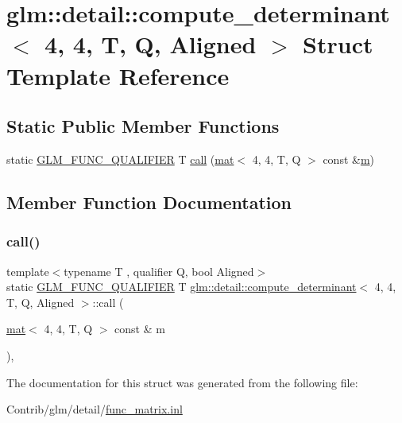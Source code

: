 \hypertarget{structglm_1_1detail_1_1compute__determinant_3_014_00_014_00_01_t_00_01_q_00_01_aligned_01_4}{}\section{glm\+:\+:detail\+:\+:compute\+\_\+determinant$<$ 4, 4, T, Q, Aligned $>$ Struct Template Reference}
\label{structglm_1_1detail_1_1compute__determinant_3_014_00_014_00_01_t_00_01_q_00_01_aligned_01_4}
\subsection*{Static Public Member Functions}
\begin{DoxyCompactItemize}
\item 
static \mbox{\hyperlink{setup_8hpp_a33fdea6f91c5f834105f7415e2a64407}{G\+L\+M\+\_\+\+F\+U\+N\+C\+\_\+\+Q\+U\+A\+L\+I\+F\+I\+ER}} T \mbox{\hyperlink{structglm_1_1detail_1_1compute__determinant_3_014_00_014_00_01_t_00_01_q_00_01_aligned_01_4_aa3ac8758c4b0477657d8df5061017f2e}{call}} (\mbox{\hyperlink{structglm_1_1mat}{mat}}$<$ 4, 4, T, Q $>$ const \&\mbox{\hyperlink{_s_d_l__opengl__glext_8h_af593500c283bf1a787a6f947f503a5c2}{m}})
\end{DoxyCompactItemize}


\subsection{Member Function Documentation}
\mbox{\label{structglm_1_1detail_1_1compute__determinant_3_014_00_014_00_01_t_00_01_q_00_01_aligned_01_4_aa3ac8758c4b0477657d8df5061017f2e}} 
\subsubsection{\texorpdfstring{call()}{call()}}
{\footnotesize\ttfamily template$<$typename T , qualifier Q, bool Aligned$>$ \\
static \mbox{\hyperlink{setup_8hpp_a33fdea6f91c5f834105f7415e2a64407}{G\+L\+M\+\_\+\+F\+U\+N\+C\+\_\+\+Q\+U\+A\+L\+I\+F\+I\+ER}} T \mbox{\hyperlink{structglm_1_1detail_1_1compute__determinant}{glm\+::detail\+::compute\+\_\+determinant}}$<$ 4, 4, T, Q, Aligned $>$\+::call (\begin{DoxyParamCaption}\item[{\mbox{\hyperlink{structglm_1_1mat}{mat}}$<$ 4, 4, T, Q $>$ const \&}]{m }\end{DoxyParamCaption})\hspace{0.3cm}{\ttfamily [inline]}, {\ttfamily [static]}}



The documentation for this struct was generated from the following file\+:\begin{DoxyCompactItemize}
\item 
Contrib/glm/detail/\mbox{\hyperlink{func__matrix_8inl}{func\+\_\+matrix.\+inl}}\end{DoxyCompactItemize}
